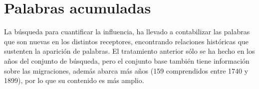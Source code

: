 \chapter{Palabras acumuladas}

La búsqueda para cuantificar la influencia, ha llevado a contabilizar las
palabras que son nuevas en los distintos receptores, encontrando relaciones históricas que sustenten la aparición de palabras.  El tratamiento anterior sólo se ha hecho en los años del conjunto de búsqueda, pero  el conjunto base  también tiene información sobre las migraciones, además  abarca más años (159 comprendidos entre 1740 y 1899), por lo que su contenido es más amplio. 












